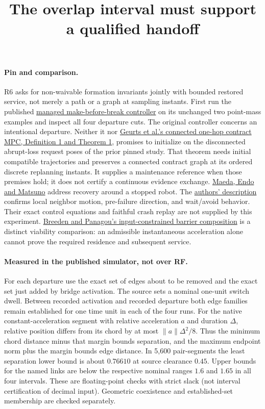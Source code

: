 \documentclass{article}
\title{The overlap interval must support a qualified handoff}
\date{}
\begin{document}
\maketitle

\paragraph{Pin and comparison.}
R6 asks for non-waivable formation invariants jointly with bounded
restored service, not merely a path or a graph at sampling instants.
First run the published
\href{https://arxiv.org/html/2609.29939v1\#S3.SS2.SSS3}
{managed make-before-break controller} on its unchanged two
point-mass examples and inspect all four departure cuts. The original
controller concerns an intentional departure. Neither it nor
\href{https://arxiv.org/pdf/2609.19912}{Geurts et al.'s connected
one-hop contract MPC, Definition 1 and Theorem 1}, promises to
initialize on the disconnected abrupt-loss request poses of the
prior pinned study. That theorem needs initial compatible trajectories
and preserves a connected contract graph at its ordered discrete
replanning instants. It supplies a maintenance reference when those
premises hold; it does not certify a continuous evidence exchange.
\href{https://www.sciencedirect.com/science/article/pii/S0016003223003046}
{Maeda, Endo and Matsuno} address recovery around a stopped robot.
The \href{https://en.endo-lab.jp/research/detail/499}{authors' description}
confirms local neighbor motion, pre-failure direction, and wait/avoid
behavior. Their exact control equations and faithful crash replay
are not supplied by this experiment.
\href{https://arxiv.org/abs/2210.01354}{Breeden and Panagou's
input-constrained barrier composition} is a distinct viability
comparison: an admissible instantaneous acceleration alone cannot
prove the required residence and subsequent service.

\paragraph{Measured in the published simulator, not over RF.}
For each departure use the exact set of edges about to be removed
and the exact set just added by bridge activation. The source
sets a nominal one-unit switch dwell. Between recorded activation
and recorded departure both edge families remain established for
one time unit in each of the four runs. For the native
constant-acceleration segment with relative acceleration $a$ and
duration $\Delta$, relative position differs from its chord by
at most $\|a\|\Delta^2/8$. Thus the minimum chord distance minus
that margin bounds separation, and the maximum endpoint norm
plus the margin bounds edge distance. In 5,600 pair-segments
the least separation lower bound is about $0.76610$ at source
clearance $0.45$. Upper bounds for the named links are below the
respective nominal ranges $1.6$ and $1.65$ in all four intervals.
These are floating-point checks with strict slack (not interval
certification of decimal input). Geometric coexistence and
established-set membership are checked separately.
\end{document}
